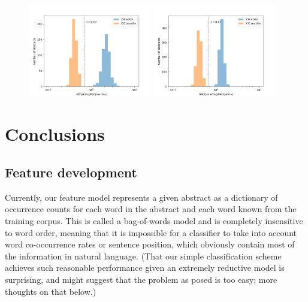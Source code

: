 \documentclass{article}
\begin{document}
\begin{figure}[!htbp]
\centering
	\includegraphics[width=0.48\textwidth]{../figures/BOW_histogram.png}
	\hfill
	\includegraphics[width=0.48\textwidth]{../figures/bigram_histogram.png}
\end{figure}




















\section{Conclusions}
\subsection{Feature development}
Currently, our feature model represents a given abstract as a dictionary of occurrence counts for each word in the abstract and each word known from the training corpus.
This is called a bag-of-words model and is completely insensitive to word order, meaning that it is impossible for a classifier to take into account word co-occurrence rates or sentence position, which obviously contain most of the information in natural language.
(That our simple classification scheme achieves such reasonable performance given an extremely reductive model is surprising, and might suggest that the problem as posed is too easy; more thoughts on that below.)
\end{document}
